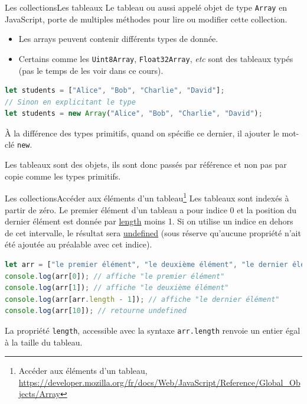 \documentclass{beamer}
\begin{document}
    \begin{frame}[fragile]{Les collections}{Les tableaux}
        Le tableau ou aussi appelé objet de type \lstinline{Array} en JavaScript, porte de multiples méthodes pour lire ou modifier cette collection.
        \begin{itemize}
            \item Les arrays peuvent contenir différents types de donnée.
            \item Certains comme les \lstinline{Uint8Array}, \lstinline{Float32Array}, \textit{etc} sont des tableaux typés (pas le temps de les voir dans ce cours).
        \end{itemize}
        \begin{lstlisting}[language=JavaScript,title={\scriptsize{Script JavaScript}}]
let students = ["Alice", "Bob", "Charlie", "David"];
// Sinon en explicitant le type
let students = new Array("Alice", "Bob", "Charlie", "David");
        \end{lstlisting}
        \begin{dangercolorbox}
            À la différence des types primitifs, quand on spécifie ce dernier, il ajouter le mot-clé \lstinline{new}.

            Les tableaux sont des objets, ils sont donc passés par référence et non pas par copie comme les types primitifs.
        \end{dangercolorbox}
    \end{frame}

    \begin{frame}[fragile]{Les collections}{Accéder aux éléments d'un tableau\footnote{Accéder aux éléments d'un tableau, \url{https://developer.mozilla.org/fr/docs/Web/JavaScript/Reference/Global\_Objects/Array}}}
        Les tableaux sont indexés à partir de zéro.
        Le premier élément d'un tableau a pour indice 0 et la position du dernier élément est donnée par \href{https://developer.mozilla.org/fr/docs/Web/JavaScript/Reference/Global\_Objects/Array/length}{length} moins 1.
        Si on utilise un indice en dehors de cet intervalle, le résultat sera \href{https://developer.mozilla.org/fr/docs/Web/JavaScript/Reference/Global_Objects/undefined}{undefined} (sous réserve qu'aucune propriété n'ait été ajoutée au préalable avec cet indice).
        \begin{lstlisting}[language=JavaScript,title={\scriptsize{Script JavaScript}}]
let arr = ["le premier élément", "le deuxième élément", "le dernier élément"];
console.log(arr[0]); // affiche "le premier élément"
console.log(arr[1]); // affiche "le deuxième élément"
console.log(arr[arr.length - 1]); // affiche "le dernier élément"
console.log(arr[10]); // retourne undefined
        \end{lstlisting}
        La propriété \lstinline{length}, accessible avec la syntaxe \lstinline{arr.length} renvoie un entier égal à la taille du tableau.
    \end{frame}
\end{document}
